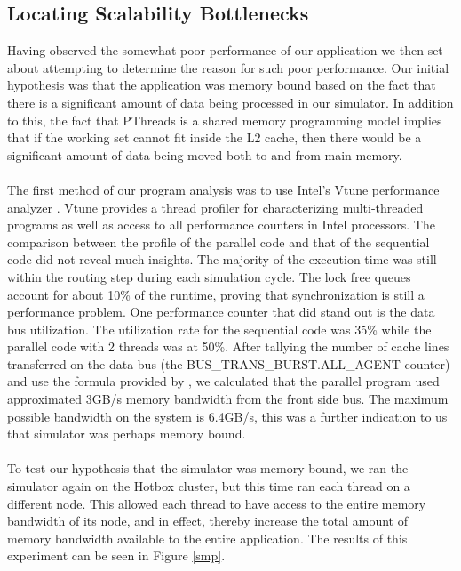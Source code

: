 \documentclass[twocolumn]{article}
\begin{document}
\subsection{Locating Scalability Bottlenecks}
Having observed the somewhat poor performance of our application we then
set about attempting to determine the reason for such poor performance.
Our initial hypothesis was that the application was memory bound based on the
fact that there is a significant amount of data being processed in our
simulator.  In addition to this, the fact that PThreads is a shared memory
programming model implies that if the working set cannot fit inside the L2
cache, then there would be a significant amount of data being moved both to
and from main memory.\\
~\\
The first method of our program analysis was to use Intel's Vtune performance analyzer \cite{vtune}. Vtune provides a thread profiler for characterizing multi-threaded programs as well as access to all performance counters in Intel processors. The comparison between the profile of the parallel code and that of the sequential code did not reveal much insights. The majority of the execution time was still within the routing step during each simulation cycle. The lock free queues account for about 10\% of the runtime, proving that synchronization is still a performance problem. One performance counter that did stand out is the data bus utilization. The utilization rate for the sequential code was 35\% while the parallel code with 2 threads was at 50\%. After tallying the number of cache lines transferred on the data bus (the BUS\_TRANS\_BURST.ALL\_AGENT counter) and use the formula provided by \cite{account}, we calculated that the parallel program used approximated 3GB/s memory bandwidth from the front side bus. The maximum possible bandwidth on the system is 6.4GB/s, this was a further indication to us that simulator was perhaps memory bound. \\
~\\
To test our hypothesis that the simulator was memory bound, we ran the
simulator again on the Hotbox cluster, but this time ran each thread on a
different node.  This allowed each thread to have access to the entire
memory bandwidth of its node, and in effect, thereby increase the total
amount of memory bandwidth available to the entire application.  The
results of this experiment can be seen in Figure \ref{smp}.\\
\end{document}

